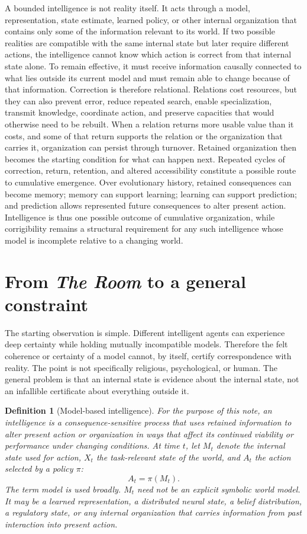 \documentclass[11pt,a4paper]{article}
\newtheorem{definition}{Definition}
\begin{document}
A bounded intelligence is not reality itself. It acts through a model, representation, state estimate, learned policy, or other internal organization that contains only some of the information relevant to its world. If two possible realities are compatible with the same internal state but later require different actions, the intelligence cannot know which action is correct from that internal state alone. To remain effective, it must receive information causally connected to what lies outside its current model and must remain able to change because of that information. Correction is therefore relational. Relations cost resources, but they can also prevent error, reduce repeated search, enable specialization, transmit knowledge, coordinate action, and preserve capacities that would otherwise need to be rebuilt. When a relation returns more usable value than it costs, and some of that return supports the relation or the organization that carries it, organization can persist through turnover. Retained organization then becomes the starting condition for what can happen next. Repeated cycles of correction, return, retention, and altered accessibility constitute a possible route to cumulative emergence. Over evolutionary history, retained consequences can become memory; memory can support learning; learning can support prediction; and prediction allows represented future consequences to alter present action. Intelligence is thus one possible outcome of cumulative organization, while corrigibility remains a structural requirement for any such intelligence whose model is incomplete relative to a changing world.

\section{From \emph{The Room} to a general constraint}

The starting observation is simple. Different intelligent agents can experience deep certainty while holding mutually incompatible models. Therefore the felt coherence or certainty of a model cannot, by itself, certify correspondence with reality. The point is not specifically religious, psychological, or human. The general problem is that an internal state is evidence about the internal state, not an infallible certificate about everything outside it.

\begin{definition}[Model-based intelligence]
For the purpose of this note, an intelligence is a consequence-sensitive process that uses retained information to alter present action or organization in ways that affect its continued viability or performance under changing conditions. At time $t$, let $M_t$ denote the internal state used for action, $X_t$ the task-relevant state of the world, and $A_t$ the action selected by a policy $\pi$:
\[
A_t = \pi(M_t).
\]
The term \emph{model} is used broadly. $M_t$ need not be an explicit symbolic world model. It may be a learned representation, a distributed neural state, a belief distribution, a regulatory state, or any internal organization that carries information from past interaction into present action.
\end{definition}
\end{document}
